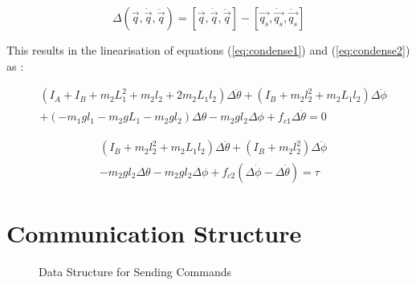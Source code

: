\begin{equation}
\label{eq:workingpoint}
\Delta( \vec{q}, \dot{ \vec{q} }, \ddot{ \vec{q} }) =  [\vec{q}, \dot{ \vec{q} }, \ddot{ \vec{q} }] - [\vec{q_{s}},\dot{\vec{q_{s}}},\ddot{\vec{q_{s}}}]
\end{equation}

This results in the linearisation of equations (\ref{eq:condense1}) and (\ref{eq:condense2}) as :

\begin{equation}
\begin{split}
&(I_{A} + I_{B} + m_{2}L_{1}^2+m_{2}l_{2}+2m_{2}L_{1}l_{2})\Delta\ddot{\theta} + (I_{B}+m_{2}l_{2}^2+m_{2}L_{1}l_{2})\Delta\ddot{\phi}\\
&+(-m_{1}gl_{1}-m_{2}gL_{1}-m_{2}gl_{2})\Delta\theta -m_{2}gl_{2}\Delta\phi + f_{c1}\Delta\dot{\theta} = 0
\end{split}
\end{equation}

\begin{equation}
\begin{split}
&(I_{B}+m_{2}l_{2}^2+m_{2}L_{1}l_{2})\Delta\ddot{\theta} + (I_{B}+m_{2}l_{2}^2)\Delta\ddot{\phi}\\
& -m_{2}gl_{2}\Delta\theta -m_{2}gl_{2}\Delta\phi +f_{c2}(\Delta\dot{\phi}-\Delta\dot{\theta}) = \tau
\end{split}
\end{equation}
















\section{Communication Structure}
\label{sec:software_requirements}
\begin{figure}[h]
	\centering
	
	\caption{Data Structure for Sending Commands}
	\label{fig:uart_struct_app}
\end{figure}

